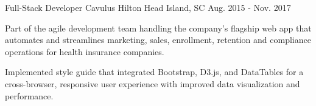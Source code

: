 \begin{cventries}
  \cventry
    {Full-Stack Developer} %
    {Cavulus} %
    {Hilton Head Island, SC} %
    {Aug. 2015 - Nov. 2017} %
    {
      \begin{cvitems} %
        \item {Part of the agile development team handling the company's flagship web app that automates and streamlines marketing, sales, enrollment, retention and compliance operations for health insurance companies.}
        \item {Implemented style guide that integrated Bootstrap, D3.js, and DataTables for a cross-browser, responsive user experience with improved data visualization and performance.}

\end{cvitems}}
\end{cventries}
